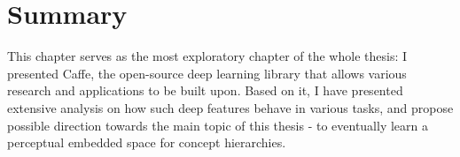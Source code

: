 \section{Summary}
This chapter serves as the most exploratory chapter of the whole thesis: I presented Caffe, the open-source deep learning library that allows various research and applications to be built upon. Based on it, I have presented extensive analysis on how such deep features behave in various tasks, and propose possible direction towards the main topic of this thesis - to eventually learn a perceptual embedded space for concept hierarchies.

